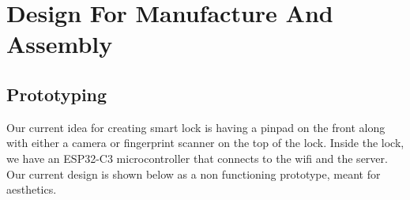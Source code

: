 \section{Design For Manufacture And Assembly}

\subsection{Prototyping}

Our current idea for creating smart lock is having a pinpad on the front along with either a camera or fingerprint scanner on the top of the lock. Inside the lock, we have an ESP32-C3 microcontroller that connects to the wifi and the server. Our current design is shown below as a non functioning prototype, meant for aesthetics.

